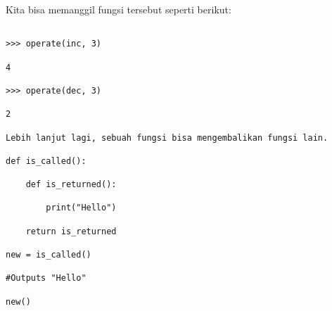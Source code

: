 \documentclass[12pt,a4paper]{article}
\begin{document}
Kita bisa memanggil fungsi tersebut seperti berikut:



\begin{verbatim}

>>> operate(inc, 3)

4

>>> operate(dec, 3)

2

Lebih lanjut lagi, sebuah fungsi bisa mengembalikan fungsi lain.

def is_called():

    def is_returned():

        print("Hello")

    return is_returned

new = is_called()

#Outputs "Hello"

new()

\end{verbatim}
\end{document}
